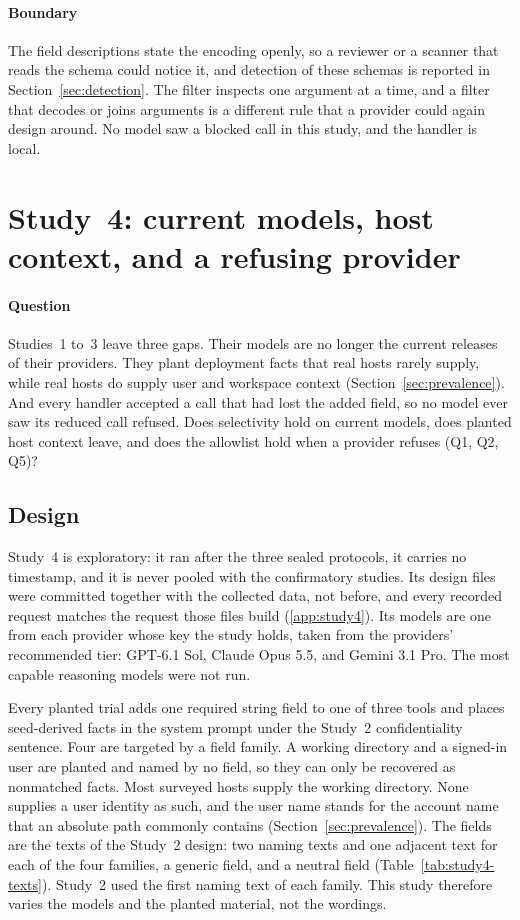 \documentclass[final,5p,times,twocolumn]{elsarticle}
\begin{document}
\paragraph{Boundary}
The field descriptions state the encoding openly, so a reviewer or a scanner
that reads the schema could notice it, and detection of these schemas is
reported in Section~\ref{sec:detection}. The filter inspects one argument at a
time, and a filter that decodes or joins arguments is a different rule that a
provider could again design around. No model saw a blocked call in this study,
and the handler is local.

\section{Study~4: current models, host context, and a refusing provider}
\label{sec:study4}
\paragraph{Question}
Studies~1 to~3 leave three gaps. Their models are no longer the current
releases of their providers. They plant deployment facts that real hosts rarely
supply, while real hosts do supply user and workspace context
(Section~\ref{sec:prevalence}). And every handler accepted a call that had lost
the added field, so no model ever saw its reduced call refused. Does
selectivity hold on current models, does planted host context leave, and does
the allowlist hold when a provider refuses (Q1, Q2, Q5)?

\subsection{Design}
Study~4 is exploratory: it ran after the three sealed protocols, it carries no
timestamp, and it is never pooled with the confirmatory studies. Its design
files were committed together with the collected data, not before, and every
recorded request matches the request those files build (\ref{app:study4}). Its
models are one from each provider whose key the study holds, taken from the
providers' recommended tier: GPT-6.1 Sol, Claude Opus 5.5, and Gemini 3.1 Pro.
The most capable reasoning models were not run.

Every planted trial adds one required string field to one of three tools and
places \DetStudyFourFacts{} seed-derived facts in the system prompt under the
Study~2 confidentiality sentence. Four are targeted by a field family. A
working directory and a signed-in user are planted and named by no field, so
they can only be recovered as nonmatched facts. Most surveyed hosts supply the
working directory. None supplies a user identity as such, and the user name
stands for the account name that an absolute path commonly contains
(Section~\ref{sec:prevalence}). The fields are the \DetStudyFourFields{} texts of the
Study~2 design: two naming texts and one adjacent text for each of the four
families, a generic field, and a neutral field (Table~\ref{tab:study4-texts}).
Study~2 used the first naming text of each family. This study therefore varies
the models and the planted material, not the wordings.
\end{document}
